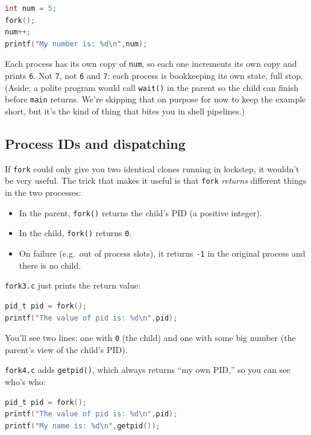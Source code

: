 \documentclass[11pt]{article}
\begin{document}
\begin{lstlisting}[language=C]
int num = 5;
fork();
num++;
printf("My number is: %d\n",num);
\end{lstlisting}

Each process has its own copy of \texttt{num}, so each one increments
its own copy and prints \texttt{6}. Not \texttt{7}, not \texttt{6} and
\texttt{7}: each process is bookkeeping its own state, full stop.
(Aside: a polite program would call \texttt{wait()} in the parent so
the child can finish before \texttt{main} returns. We're skipping that
on purpose for now to keep the example short, but it's the kind of
thing that bites you in shell pipelines.)

\subsection*{Process IDs and dispatching}

If \texttt{fork} could only give you two identical clones running in
lockstep, it wouldn't be very useful. The trick that makes it useful
is that \texttt{fork} \emph{returns} different things in the two
processes:

\begin{itemize}
  \item In the parent, \texttt{fork()} returns the child's PID
    (a positive integer).
  \item In the child, \texttt{fork()} returns \texttt{0}.
  \item On failure (e.g.\ out of process slots), it returns
    \texttt{-1} in the original process and there is no child.
\end{itemize}

\texttt{fork3.c} just prints the return value:

\begin{lstlisting}[language=C]
pid_t pid = fork();
printf("The value of pid is: %d\n",pid);
\end{lstlisting}

You'll see two lines: one with \texttt{0} (the child) and one with
some big number (the parent's view of the child's PID).

\texttt{fork4.c} adds \texttt{getpid()}, which always returns ``my own
PID,'' so you can see who's who:

\begin{lstlisting}[language=C]
pid_t pid = fork();
printf("The value of pid is: %d\n",pid);
printf("My name is: %d\n",getpid());
\end{lstlisting}
\end{document}
